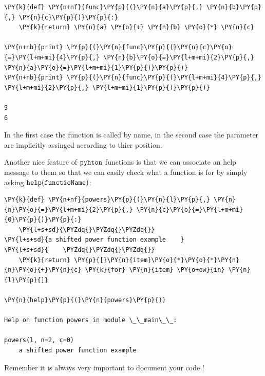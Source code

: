 \begin{tcolorbox}[breakable, size=fbox, boxrule=1pt, pad at break*=1mm,colback=cellbackground, colframe=cellborder]
\begin{Verbatim}[commandchars=\\\{\}]
\PY{k}{def} \PY{n+nf}{func}\PY{p}{(}\PY{n}{a}\PY{p}{,} \PY{n}{b}\PY{p}{,} \PY{n}{c}\PY{p}{)}\PY{p}{:}
    \PY{k}{return} \PY{n}{a} \PY{o}{+} \PY{n}{b} \PY{o}{*} \PY{n}{c}

\PY{n+nb}{print} \PY{p}{(}\PY{n}{func}\PY{p}{(}\PY{n}{c}\PY{o}{=}\PY{l+m+mi}{4}\PY{p}{,} \PY{n}{b}\PY{o}{=}\PY{l+m+mi}{2}\PY{p}{,} \PY{n}{a}\PY{o}{=}\PY{l+m+mi}{1}\PY{p}{)}\PY{p}{)}
\PY{n+nb}{print} \PY{p}{(}\PY{n}{func}\PY{p}{(}\PY{l+m+mi}{4}\PY{p}{,} \PY{l+m+mi}{2}\PY{p}{,} \PY{l+m+mi}{1}\PY{p}{)}\PY{p}{)}

9
6
\end{Verbatim}
\end{tcolorbox}

In the first case the function is called by name, in the second case the parameter are implicitly assinged according to thier position.

Another nice feature of $\tt{pyhton}$ functions is that we can associate an help message to them so that we can easily check what a function is for by simply asking $\tt{help(functioName)}$:

\begin{tcolorbox}[breakable, size=fbox, boxrule=1pt, pad at break*=1mm,colback=cellbackground, colframe=cellborder]
\begin{Verbatim}[commandchars=\\\{\}]
\PY{k}{def} \PY{n+nf}{powers}\PY{p}{(}\PY{n}{l}\PY{p}{,} \PY{n}{n}\PY{o}{=}\PY{l+m+mi}{2}\PY{p}{,} \PY{n}{c}\PY{o}{=}\PY{l+m+mi}{0}\PY{p}{)}\PY{p}{:}
    \PY{l+s+sd}{\PYZdq{}\PYZdq{}\PYZdq{}}
\PY{l+s+sd}{a shifted power function example    }
\PY{l+s+sd}{    \PYZdq{}\PYZdq{}\PYZdq{}}
    \PY{k}{return} \PY{p}{[}\PY{n}{item}\PY{o}{*}\PY{o}{*}\PY{n}{n}\PY{o}{+}\PY{n}{c} \PY{k}{for} \PY{n}{item} \PY{o+ow}{in} \PY{n}{l}\PY{p}{]}

\PY{n}{help}\PY{p}{(}\PY{n}{powers}\PY{p}{)}

Help on function powers in module \_\_main\_\_:

powers(l, n=2, c=0)
    a shifted power function example
\end{Verbatim}
\end{tcolorbox}

Remember it is always very important to document your code !

